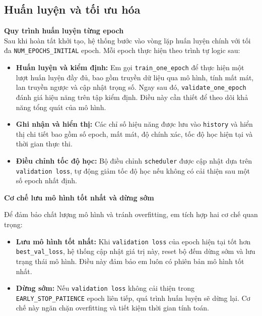 \documentclass[12pt, a4paper, openany]{report}
\begin{document}
\subsection{Huấn luyện và tối ưu hóa}
\textbf{Quy trình huấn luyện từng epoch} \\
Sau khi hoàn tất khởi tạo, hệ thống bước vào vòng lặp huấn luyện chính với tối đa \texttt{NUM\_EPOCHS\_INITIAL} epoch. Mỗi epoch thực hiện theo trình tự logic sau:
\begin{itemize}
    \item \textbf{Huấn luyện và kiểm định:} Em gọi \texttt{train\_one\_epoch} để thực hiện một lượt huấn luyện đầy đủ, bao gồm truyền dữ liệu qua mô hình, tính mất mát, lan truyền ngược và cập nhật trọng số. Ngay sau đó, \texttt{validate\_one\_epoch} đánh giá hiệu năng trên tập kiểm định. Điều này cần thiết để theo dõi khả năng tổng quát của mô hình.
    \item \textbf{Ghi nhận và hiển thị:} Các chỉ số hiệu năng được lưu vào \texttt{history} và hiển thị chi tiết bao gồm số epoch, mất mát, độ chính xác, tốc độ học hiện tại và thời gian thực thi.
    \item \textbf{Điều chỉnh tốc độ học:} Bộ điều chỉnh \texttt{scheduler} được cập nhật dựa trên \texttt{validation loss}, tự động giảm tốc độ học nếu không có cải thiện sau một số epoch nhất định.
\end{itemize}

\textbf{Cơ chế lưu mô hình tốt nhất và dừng sớm} 

Để đảm bảo chất lượng mô hình và tránh overfitting, em tích hợp hai cơ chế quan trọng:
\begin{itemize}
    \item \textbf{Lưu mô hình tốt nhất:} Khi \texttt{validation loss} của epoch hiện tại tốt hơn \texttt{best\_val\_loss}, hệ thống cập nhật giá trị này, reset bộ đếm dừng sớm và lưu trạng thái mô hình. Điều này đảm bảo em luôn có phiên bản mô hình tốt nhất.
    \item \textbf{Dừng sớm:} Nếu \texttt{validation loss} không cải thiện trong \texttt{EARLY\_STOP\_PATIENCE} epoch liên tiếp, quá trình huấn luyện sẽ dừng lại. Cơ chế này ngăn chặn overfitting và tiết kiệm thời gian tính toán.
\end{itemize}
\end{document}
